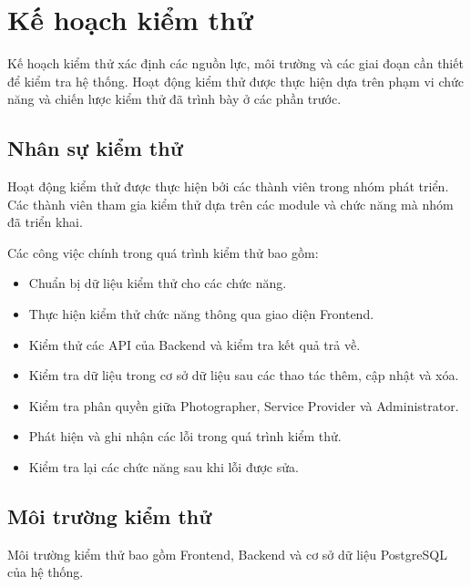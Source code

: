 
\section{Kế hoạch kiểm thử}

Kế hoạch kiểm thử xác định các nguồn lực, môi trường và các giai đoạn cần thiết để kiểm tra hệ thống. Hoạt động kiểm thử được thực hiện dựa trên phạm vi chức năng và chiến lược kiểm thử đã trình bày ở các phần trước.

\subsection{Nhân sự kiểm thử}

Hoạt động kiểm thử được thực hiện bởi các thành viên trong nhóm phát triển. Các thành viên tham gia kiểm thử dựa trên các module và chức năng mà nhóm đã triển khai.

Các công việc chính trong quá trình kiểm thử bao gồm:

\begin{itemize}
	\item Chuẩn bị dữ liệu kiểm thử cho các chức năng.
	\item Thực hiện kiểm thử chức năng thông qua giao diện Frontend.
	\item Kiểm thử các API của Backend và kiểm tra kết quả trả về.
	\item Kiểm tra dữ liệu trong cơ sở dữ liệu sau các thao tác thêm, cập nhật và xóa.
	\item Kiểm tra phân quyền giữa Photographer, Service Provider và Administrator.
	\item Phát hiện và ghi nhận các lỗi trong quá trình kiểm thử.
	\item Kiểm tra lại các chức năng sau khi lỗi được sửa.
\end{itemize}

\subsection{Môi trường kiểm thử}

Môi trường kiểm thử bao gồm Frontend, Backend và cơ sở dữ liệu PostgreSQL của hệ thống.

